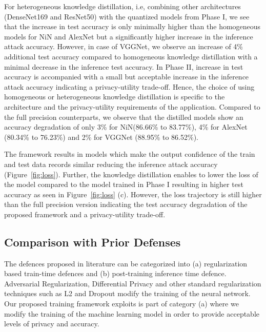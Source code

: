 For heterogeneous knowledge distillation, i.e, combining other architectures (DenseNet169 and ResNet50) with the quantized models from Phase I, we see that the increase in test accuracy is only minimally higher than the homogeneous models for NiN and AlexNet but a significantly higher increase in the inference attack accuracy.
However, in case of VGGNet, we observe an increase of 4\% additional test accuracy compared to homogeneous knowledge distillation with a minimal decrease in the inference test accuracy.
In Phase II, increase in test accuracy is accompanied with a small but acceptable increase in the inference attack accuracy indicating a privacy-utility trade-off.
Hence, the choice of using homogeneous or heterogeneous knowledge distillation is specific to the architecture and the privacy-utility requirements of the application.
Compared to the full precision counterparts, we observe that the distilled models show an accuracy degradation of only 3\% for NiN(86.66\% to 83.77\%), 4\% for AlexNet (80.34\% to 76.23\%) and 2\% for VGGNet (88.95\% to 86.52\%).

The \method\hspace{0.02in} framework results in models which make the output confidence of the train and test data records similar reducing the inference attack accuracy (Figure~\ref{fig:loss}).
Further, the knowledge distillation enables to lower the loss of the model compared to the model trained in Phase I resulting in higher test accuracy as seen in Figure~\ref{fig:loss} (c).
However, the loss trajectory is still higher than the full precision version indicating the test accuracy degradation of the proposed framework and a privacy-utility trade-off.

\subsection{Comparison with Prior Defenses}

The defences proposed in literature can be categorized into (a) regularization based train-time defences and (b) post-training inference time defence.
Adversarial Regularization, Differential Privacy and other standard regularization techniques such as L2 and Dropout modify the training of the neural network.
Our proposed training framework exploits is part of category (a) where we modify the training of the machine learning model in order to provide acceptable levels of privacy and accuracy.


